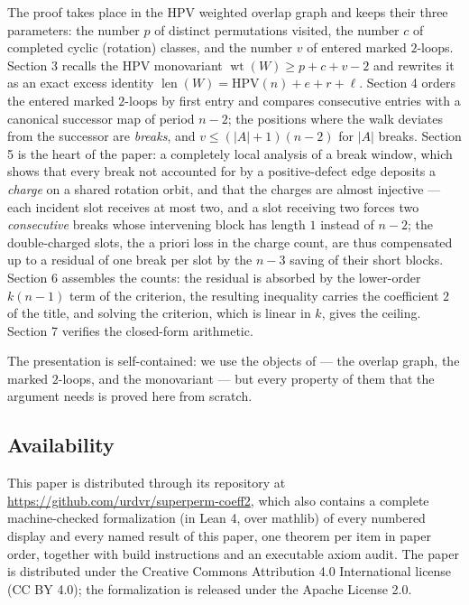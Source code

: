 \documentclass[11pt]{article}
\DeclareMathOperator{\wt}{wt}
\DeclareMathOperator{\len}{len}
\newcommand{\HPV}{\mathrm{HPV}}
\begin{document}
The proof takes place in the HPV weighted overlap graph and keeps their three parameters: the
number \(p\) of distinct permutations visited, the number \(c\) of completed cyclic (rotation)
classes, and the number \(v\) of entered marked \(2\)-loops.  Section 3 recalls the HPV
monovariant \(\wt(W)\ge p+c+v-2\) and rewrites it as an exact excess identity
\(\len(W)=\HPV(n)+e+r+\ell\).  Section 4 orders the entered marked \(2\)-loops by first entry and
compares consecutive entries with a canonical successor map of period \(n-2\); the positions where
the walk deviates from the successor are \emph{breaks}, and \(v\le(|A|+1)(n-2)\) for \(|A|\)
breaks.  Section 5 is the heart of the paper: a completely local analysis of a break window,
which shows that every break not accounted for by a positive-defect edge deposits a \emph{charge}
on a shared rotation orbit, and that the charges are almost injective --- each incident slot
receives at most two, and a slot receiving two forces two \emph{consecutive} breaks whose
intervening block has length \(1\) instead of \(n-2\); the double-charged slots, the a priori
loss in the charge count, are thus compensated up to a residual of one break per slot by the
\(n-3\) saving of their short blocks.  Section 6 assembles the counts: the residual is absorbed
by the lower-order \(k(n-1)\) term of the criterion, the resulting inequality carries the
coefficient \(2\) of the title, and solving the criterion, which is linear in \(k\), gives the
ceiling.  Section 7 verifies the closed-form arithmetic.

The presentation is self-contained: we use the objects of \cite{HPV} --- the overlap graph,
the marked \(2\)-loops, and the monovariant --- but every property of them that the argument
needs is proved here from scratch.

\subsection*{Availability}

This paper is distributed through its repository at
\url{https://github.com/urdvr/superperm-coeff2}, which also contains a complete
machine-checked formalization (in Lean 4, over mathlib) of every numbered display and
every named result of this paper, one theorem per item in paper order, together with
build instructions and an executable axiom audit.  The paper is distributed under the
Creative Commons Attribution 4.0 International license (CC BY 4.0); the formalization
is released under the Apache License 2.0.
\end{document}
